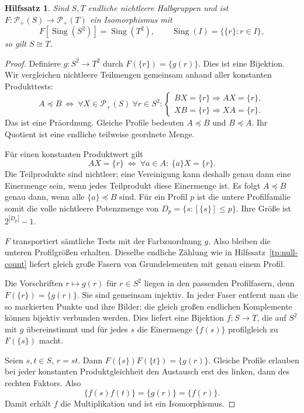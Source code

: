 \documentclass[a4paper,11pt]{article}
\newcommand{\Pp}[1]{\mathcal P_+(#1)}
\newcommand{\Sing}{\operatorname{Sing}}
\newtheorem{lemma}{Hilfssatz}
\theoremstyle{remark}
\begin{document}
\begin{lemma}\label{tp:conditional}
Sind \(S,T\) endliche nichtleere Halbgruppen und ist
\(F:\Pp S\to\Pp T\) ein Isomorphismus mit
\[
 F[\Sing(S^2)]=\Sing(T^2),\qquad
 \Sing(I)=\{\{r\}:r\in I\},
\]
so gilt \(S\cong T\).
\end{lemma}
\begin{proof}
Definiere \(g:S^2\to T^2\) durch
\(F(\{r\})=\{g(r)\}\). Dies ist eine Bijektion. Wir vergleichen
nichtleere Teilmengen gemeinsam anhand aller konstanten Produkttests:
\[
 A\preceq B\ \Longleftrightarrow\
 \forall X\in\Pp S\ \forall r\in S^2:
 \begin{cases}
 BX=\{r\}\Rightarrow AX=\{r\},\\
 XB=\{r\}\Rightarrow XA=\{r\}.
 \end{cases}
\]
Das ist eine Präordnung. Gleiche Profile bedeuten
\(A\preceq B\) und \(B\preceq A\). Ihr Quotient ist eine
endliche teilweise geordnete Menge.

Für einen konstanten Produktwert gilt
\[
 AX=\{r\}\ \Longleftrightarrow\
 \forall a\in A:\ \{a\}X=\{r\}.
\]
Die Teilprodukte sind nichtleer; eine Vereinigung kann deshalb genau
dann eine Einermenge sein, wenn jedes Teilprodukt diese Einermenge
ist. Es folgt
\(A\preceq B\) genau dann, wenn alle \(\{a\}\preceq B\)
sind. Für ein Profil \(p\) ist die untere Profilfamilie somit die
volle nichtleere Potenzmenge von
\(D_p=\{s:[\{s\}]\le p\}\). Ihre Größe ist
\(2^{|D_p|}-1\).

\(F\) transportiert sämtliche Tests mit der Farbzuordnung \(g\).
Also bleiben die unteren Profilgrößen erhalten. Dieselbe endliche
Zählung wie in Hilfssatz~\ref{tp:null-count} liefert gleich große
Fasern von Grundelementen mit genau einem Profil.

Die Vorschriften \(r\mapsto g(r)\) für \(r\in S^2\) liegen
in den passenden Profilfasern, denn \(F(\{r\})=\{g(r)\}\).
Sie sind gemeinsam injektiv. In jeder Faser entfernt man die so
markierten Punkte und ihre Bilder; die gleich großen endlichen
Komplemente können bijektiv verbunden werden. Dies liefert eine
Bijektion \(f:S\to T\), die auf \(S^2\) mit \(g\)
übereinstimmt und für jedes \(s\) die Einermenge \(\{f(s)\}\)
profilgleich zu \(F(\{s\})\) macht.

Seien \(s,t\in S\), \(r=st\). Dann
\(F(\{s\})F(\{t\})=\{g(r)\}\). Gleiche Profile erlauben
bei jeder konstanten Produktgleichheit den Austausch erst des linken,
dann des rechten Faktors. Also
\[
 \{f(s)f(t)\}=\{g(r)\}=\{f(r)\}.
\]
Damit erhält \(f\) die Multiplikation und ist ein Isomorphismus.
\end{proof}
\end{document}
